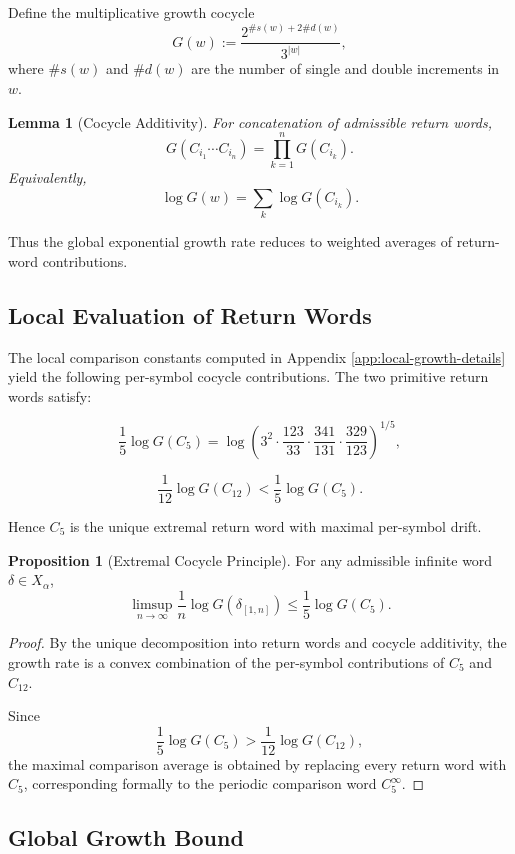 \documentclass[12pt, oneside]{article}
\numberwithin{equation}{section}
\theoremstyle{definition}
\newtheorem{proposition}{Proposition}[section]
\theoremstyle{plain}
\newtheorem{lemma}[theorem]{Lemma}
\theoremstyle{remark}
\begin{document}
Define the multiplicative growth cocycle
\[
G(w) := \frac{2^{\#s(w) + 2\#d(w)}}{3^{|w|}},
\]
where $\#s(w)$ and $\#d(w)$ are the number of single and double increments in $w$.

\begin{lemma}[Cocycle Additivity]
For concatenation of admissible return words,
\[
G(C_{i_1} \cdots C_{i_n}) = \prod_{k=1}^n G(C_{i_k}).
\]
Equivalently,
\[
\log G(w) = \sum_{k} \log G(C_{i_k}).
\]
\end{lemma}
Thus the global exponential growth rate reduces to weighted averages
of return-word contributions.

\subsection{Local Evaluation of Return Words}

The local comparison constants computed in Appendix \ref{app:local-growth-details}
yield the following per-symbol cocycle contributions. The two primitive return words satisfy:

\[
\frac{1}{5}\log G(C_5)
=
\log\!\left(
3^{2}
\cdot \frac{123}{33}
\cdot \frac{341}{131}
\cdot \frac{329}{123}
\right)^{1/5},
\]

\[
\frac{1}{12}\log G(C_{12})
<
\frac{1}{5}\log G(C_5).
\]

Hence $C_5$ is the unique extremal return word with maximal per-symbol drift.

\begin{proposition}[Extremal Cocycle Principle]
For any admissible infinite word $\delta \in X_\alpha$,
\[
\limsup_{n\to\infty}
\frac{1}{n} \log G(\delta_{[1,n]})
\le
\frac{1}{5}\log G(C_5).
\]
\end{proposition}

\begin{proof}
By the unique decomposition into return words and cocycle additivity,
the growth rate is a convex combination of the per-symbol contributions
of $C_5$ and $C_{12}$.

Since
\[
\frac{1}{5}\log G(C_5)
>
\frac{1}{12}\log G(C_{12}),
\]
the maximal comparison average is obtained by replacing every return word with $C_5$,
corresponding formally to the periodic comparison word $C_5^\infty$.
\end{proof}

\subsection{Global Growth Bound}
\end{document}
